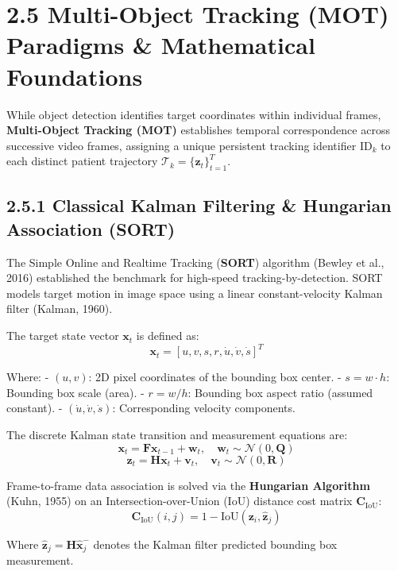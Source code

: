 \section{2.5 Multi-Object Tracking (MOT) Paradigms \& Mathematical
Foundations}\label{multi-object-tracking-mot-paradigms-mathematical-foundations}

While object detection identifies target coordinates within individual
frames, \textbf{Multi-Object Tracking (MOT)} establishes temporal
correspondence across successive video frames, assigning a unique
persistent tracking identifier \(\text{ID}_k\) to each distinct patient
trajectory \(\mathcal{T}_k = \{ \mathbf{z}_t \}_{t=1}^T\).

\subsection{2.5.1 Classical Kalman Filtering \& Hungarian Association
(SORT)}\label{classical-kalman-filtering-hungarian-association-sort}

The Simple Online and Realtime Tracking (\textbf{SORT}) algorithm
(Bewley et al., 2016) established the benchmark for high-speed
tracking-by-detection. SORT models target motion in image space using a
linear constant-velocity Kalman filter (Kalman, 1960).

The target state vector \(\mathbf{x}_t\) is defined as:
\[\mathbf{x}_t = [u, v, s, r, \dot{u}, \dot{v}, \dot{s}]^T\]

Where: - \((u, v)\): 2D pixel coordinates of the bounding box center. -
\(s = w \cdot h\): Bounding box scale (area). - \(r = w / h\): Bounding
box aspect ratio (assumed constant). - \((\dot{u}, \dot{v}, \dot{s})\):
Corresponding velocity components.

The discrete Kalman state transition and measurement equations are:
\[\mathbf{x}_t = \mathbf{F} \mathbf{x}_{t-1} + \mathbf{w}_t, \quad \mathbf{w}_t \sim \mathcal{N}(0, \mathbf{Q})\]
\[\mathbf{z}_t = \mathbf{H} \mathbf{x}_t + \mathbf{v}_t, \quad \mathbf{v}_t \sim \mathcal{N}(0, \mathbf{R})\]

Frame-to-frame data association is solved via the \textbf{Hungarian
Algorithm} (Kuhn, 1955) on an Intersection-over-Union (IoU) distance
cost matrix \(\mathbf{C}_{\text{IoU}}\):
\[\mathbf{C}_{\text{IoU}}(i, j) = 1 - \text{IoU}(\mathbf{z}_i, \hat{\mathbf{z}}_j)\]

Where \(\hat{\mathbf{z}}_j = \mathbf{H} \hat{\mathbf{x}}_j^{-}\) denotes
the Kalman filter predicted bounding box measurement.

